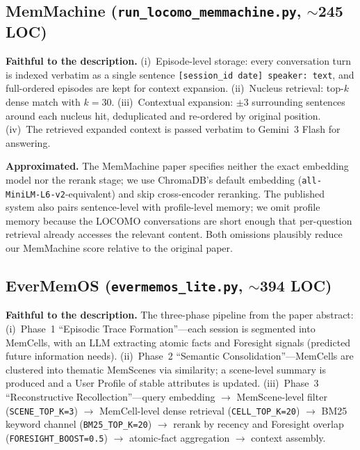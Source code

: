 \subsection{MemMachine (\texttt{run\_locomo\_memmachine.py}, \texorpdfstring{$\sim$245}{\textasciitilde 245} LOC)}

\textbf{Faithful to the description.} (i)~Episode-level storage: every conversation turn is indexed verbatim as a single sentence \texttt{[session\_id date] speaker: text}, and full-ordered episodes are kept for context expansion. (ii)~Nucleus retrieval: top-$k$ dense match with $k{=}30$. (iii)~Contextual expansion: $\pm 3$ surrounding sentences around each nucleus hit, deduplicated and re-ordered by original position. (iv)~The retrieved expanded context is passed verbatim to Gemini~3 Flash for answering.

\textbf{Approximated.} The MemMachine paper specifies neither the exact embedding model nor the rerank stage; we use ChromaDB's default embedding (\texttt{all-MiniLM-L6-v2}-equivalent) and skip cross-encoder reranking. The published system also pairs sentence-level with profile-level memory; we omit profile memory because the LOCOMO conversations are short enough that per-question retrieval already accesses the relevant content. Both omissions plausibly reduce our MemMachine score relative to the original paper.

\subsection{EverMemOS (\texttt{evermemos\_lite.py}, \texorpdfstring{$\sim$394}{\textasciitilde 394} LOC)}

\textbf{Faithful to the description.} The three-phase pipeline from the paper abstract: (i)~Phase~1 ``Episodic Trace Formation''---each session is segmented into MemCells, with an LLM extracting atomic facts and Foresight signals (predicted future information needs). (ii)~Phase~2 ``Semantic Consolidation''---MemCells are clustered into thematic MemScenes via similarity; a scene-level summary is produced and a User Profile of stable attributes is updated. (iii)~Phase~3 ``Reconstructive Recollection''---query embedding $\to$ MemScene-level filter (\texttt{SCENE\_TOP\_K=3}) $\to$ MemCell-level dense retrieval (\texttt{CELL\_TOP\_K=20}) $\to$ BM25 keyword channel (\texttt{BM25\_TOP\_K=20}) $\to$ rerank by recency and Foresight overlap (\texttt{FORESIGHT\_BOOST=0.5}) $\to$ atomic-fact aggregation $\to$ context assembly.


